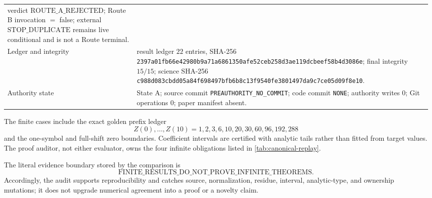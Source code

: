 \begin{table}[H]
\begin{tabularx}{\textwidth}{>{\raggedright\arraybackslash}p{3.15cm}
                            >{\raggedright\arraybackslash}X}
    verdict \(\mathrm{ROUTE\_A\_REJECTED}\);
    Route B invocation \(=\) false;
    external \(\mathrm{STOP\_DUPLICATE}\) remains live conditional and is
    not a Route terminal. \\
Ledger and integrity
  & result ledger \(22\) entries, SHA-256
    \nolinkurl{2397a01fb66e42980b9a71a6861350afe52ceb258d3ae119dcbeef58b4d3086e};
    final integrity \(15/15\);
    science SHA-256
    \nolinkurl{c988d083cbdd05a84f698497bfb6b8c13f9540fe3801497da9c7ce05d09f8e10}. \\
Authority state
  & State A; source commit \texttt{PREAUTHORITY\_NO\_COMMIT};
    code commit \texttt{NONE}; authority writes \(0\); Git operations \(0\);
    paper manifest absent. \\
\bottomrule
\end{tabularx}
\end{table}

The finite cases include the exact golden prefix ledger
\[
  Z(0),\ldots,Z(10)
  =1,2,3,6,10,20,30,60,96,192,288
\]
and the one-symbol and full-shift zero boundaries.  Coefficient intervals are
certified with analytic tails rather than fitted from target values.  The
proof auditor, not either evaluator, owns the four infinite obligations
listed in \cref{tab:canonical-replay}.

The literal evidence boundary stored by the comparison is
\[
  \mathrm{FINITE\_RESULTS\_DO\_NOT\_PROVE\_INFINITE\_THEOREMS}.
\]
Accordingly, the audit supports reproducibility and catches source,
normalization, residue, interval, analytic-type, and ownership mutations; it
does not upgrade numerical agreement into a proof or a novelty claim.
